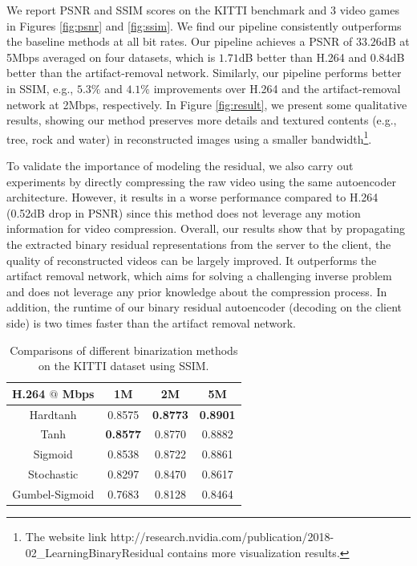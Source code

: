 \documentclass[letterpaper]{article} %
\begin{document}
	We report PSNR and SSIM scores on the KITTI benchmark and 3 video games in Figures \ref{fig:psnr} and \ref{fig:ssim}. We find our pipeline consistently outperforms the baseline methods at all bit rates. Our pipeline achieves a PSNR of $33.26$dB at 5Mbps averaged on four datasets, which is $1.71$dB better than H.264 and $0.84$dB better than the artifact-removal network. Similarly, our pipeline performs better in SSIM, e.g., $5.3\%$ and $4.1\%$ improvements over H.264 and the artifact-removal network at 2Mbps, respectively. In Figure \ref{fig:result}, we present some qualitative results, showing our method preserves more details and textured contents (e.g., tree, rock and water) in reconstructed images using a smaller bandwidth\footnote{The website link http://research.nvidia.com/publication/2018-02\_Learning\-Binary\-Residual contains more visualization results.}.


	To validate the importance of modeling the residual, we also carry out experiments by directly compressing the raw video using the same autoencoder architecture. However, it results in a worse performance compared to H.264 (0.52dB drop in PSNR) since this method does not leverage any motion information for video compression. 	Overall, our results show that by propagating the extracted binary residual representations from the server to the client, the quality of reconstructed videos can be largely improved. It outperforms the artifact removal network, which aims for solving a challenging inverse problem and does not leverage any prior knowledge about the compression process. In addition, the runtime of our binary residual autoencoder (decoding on the client side) is two times faster than the artifact removal network.

	\begin{table}[t]
		\caption{Comparisons of different binarization methods on the KITTI dataset using SSIM.
		}
		\centering
		\begin{tabular}{cccc}
			\toprule
			H.264 $@$ Mbps & 1M & 2M & 5M \\
			\hline

			Hardtanh & 0.8575 & \textbf{0.8773} & \textbf{0.8901} \\
			\hline

			Tanh & \textbf{0.8577} & 0.8770 & 0.8882 \\
			\hline

			Sigmoid & 0.8538 & 0.8722 & 0.8861 \\
			\hline

			Stochastic & 0.8297 & 0.8470 & 0.8617 \\
			\hline

			Gumbel-Sigmoid & 0.7683 & 0.8128 & 0.8464 \\
			\bottomrule
		\end{tabular}
		\label{tab:binary_ssim}
	\end{table}
\end{document}
